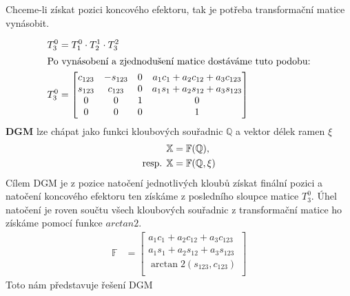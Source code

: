 \documentclass{article}
\begin{document}
				Chceme-li získat pozici koncového efektoru, tak je potřeba transformační matice vynásobit. 
			
					\begin{align}
						T^0_3 &= T^0_1 \cdot T^1_2 \cdot T^2_3 \\
						\intertext{Po vynásobení a zjednodušení matice dostáváme tuto podobu:}
						T^0_3 &= \begin{bmatrix}
							c_{123} & -s_{123} & 0 & a_1c_1 + a_2c_{12} + a_3c_{123} \\
							s_{123} & c_{123} & 0 & a_1s_1 + a_2s_{12} + a_3s_{123} \\
							0 & 0 & 1 & 0 \\
							0 & 0 & 0 & 1 \\
						\end{bmatrix} \label{eq:dgb_trans_mat_final} \\
					\end{align}
				\textbf{DGM} lze chápat jako funkci kloubových souřadnic \(\mathbb{Q}\) a vektor délek ramen \(\xi\)
					\begin{align}
						\mathbb{X} &= \mathbb{F}(\mathbb{Q}), \label{eq:dgm_eq_gen} \\
						\textnormal{resp.  } \mathbb{X} &= \mathbb{F}(\mathbb{Q}, \xi) \nonumber\\
					\end{align}
				Cílem DGM je z pozice natočení jednotlivých kloubů získat finální pozici a natočení koncového efektoru ten získáme z posledního sloupce matice $T^0_3$. Úhel natočení je roven součtu všech kloubových souřadnic z transformační matice ho získáme pomocí funkce \(arctan2\).
					\begin{align}
					\mathbb{F} &= \begin{bmatrix}
					  	 a_1c_1 + a_2c_{12} + a_3c_{123} \\
					     a_1s_1 + a_2s_{12} + a_3s_{123} \\
					  	\arctan2({s_{123}}, {c_{123}}) \\
					\end{bmatrix} \label{eq:dgm:f}
					\end{align}
				Toto nám představuje řešení DGM 
\end{document}
